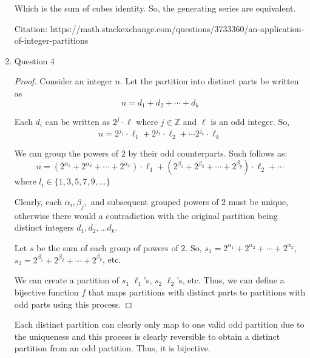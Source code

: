 \documentclass[12pt]{exam}
\begin{document}
\begin{enumerate}
Which is the sum of cubes identity. So, the generating series are equivalent. 

Citation: https://math.stackexchange.com/questions/3733360/an-application-of-integer-partitions

\item Question 4

\begin{proof}
Consider an integer $n$. Let the partition into distinct parts be written as $$n = d_1 + d_2 + \cdots + d_k$$

Each $d_i$ can be written as $2^j\cdot \ell$ where $j \in \mathbb{Z}$ and $\ell$ is an odd integer. So, $$n = 2^{j_1}\cdot \ell_1 + 2^{j_2} \cdot \ell_2 + \cdots 2^{j_k}\cdot \ell_k$$

We can group the powers of $2$ by their odd counterparts. Such follows as: $$n = (2^{\alpha_1} + 2^{\alpha_2} + \cdots + 2^{\alpha_x}) \cdot \ell_1 + (2^{\beta_1} + 2^{\beta_2} + \cdots + 2^{\beta_y}) \cdot \ell_2 + \cdots $$ where $l_i \in \{1, 3, 5, 7, 9, \dots\}$

Clearly, each $\alpha_i, \beta_j, $ and subsequent grouped powers of $2$ must be unique, otherwise there would a contradiction with the original partition being distinct integers $d_1, d_2, \dots d_k$. 

Let $s$ be the sum of each group of powers of $2$. So, $s_1 = 2^{\alpha_1} + 2^{\alpha_2} + \cdots + 2^{\alpha_x}$, $s_2 = 2^{\beta_1} + 2^{\beta_2} + \cdots + 2^{\beta_y}$, etc.

We can create a partition of $s_1$ $\ell_1$'s, $s_2$ $\ell_2$'s, etc. Thus, we can define a bijective function $f$ that maps partitions with distinct parts to partitions with odd parts using this process. 
\end{proof}

Each distinct partition can clearly only map to one valid odd partition due to the uniqueness and this process is clearly reversible to obtain a distinct partition from an odd partition. Thus, it is bijective.  

\end{enumerate}
\end{document}
